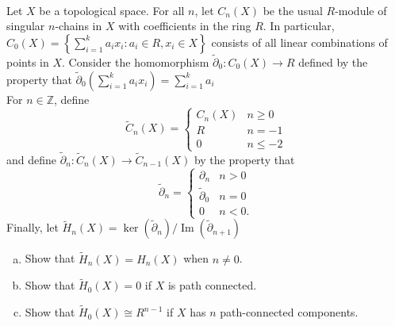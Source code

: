 \documentclass{article}
\newenvironment{problem}[2][Problem]{\begin{trivlist}
\item[\hskip \labelsep {\bfseries #1}\hskip \labelsep {\bfseries #2.}]}{\end{trivlist}}
\newcommand{\fn}[3]{#1 \colon #2 \rightarrow #3}
\newcommand{\set}[1]{\left\{ #1 \right\}}
\DeclareMathOperator{\im}{Im}
\begin{document}
\pagebreak
\begin{problem}{2} \text{} \\
  Let $X$ be a topological space. For all $n$, let $C_n(X)$ be the usual
  $R$-module of singular $n$-chains in $X$ with coefficients in the ring $R$.
  In particular, $C_0(X) = \set{\sum_{i=1}^k a_ix_i : a_i \in R, x_i \in X}$
  consists of all linear combinations of points in $X$. Consider the
  homomorphism $\fn{\widetilde \partial_0}{C_0(X)}{R}$ defined by the property
  that $
    \widetilde \partial_0\left(\sum_{i=1}^k a_ix_i\right) = \sum_{i=1}^k a_i
  $
  \\
  For $n \in \mathbb Z$, define \[
    \widetilde C_n(X) = \begin{cases}
      C_n(X) & n \geq 0 \\
      R      & n    = -1 \\
      0      & n \leq -2
    \end{cases}
  \] and define $\fn{\widetilde\partial_n}{\widetilde C_n(X)}{\widetilde C_{n-1}(X)}$ by
  the property that \[
    \widetilde \partial_n = \begin{cases}
      \partial_n        & n > 0 \\
      \widetilde \partial_0 & n = 0 \\
      0                 & n < 0.
    \end{cases}
  \]
  Finally, let $\widetilde H_n(X) = \ker(\widetilde\partial_n)/\im(\widetilde\partial_{n+1})$
  \begin{enumerate}[a.]
    \item Show that $\widetilde H_n(X) = H_n(X)$ when $n \neq 0$.
    \item Show that $\widetilde H_0(X) = 0$ if $X$ is path connected.
    \item Show that $\widetilde H_0(X) \cong R^{n-1}$ if $X$ has $n$
    path-connected components.
  \end{enumerate}
\end{problem}
\end{document}
